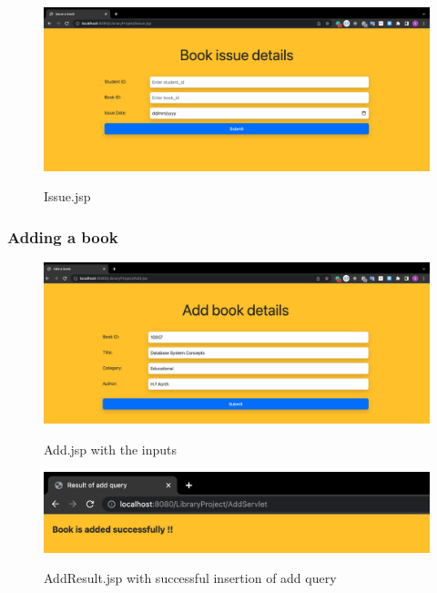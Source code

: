 \documentclass[12pt]{article}
\begin{document}
\newpage

\begin{figure}[!hbt]
    \centering
    \includegraphics[scale=0.34]{screenshots/b3_05.png}
    \label{fig:my_label1}
    \caption{Issue.jsp}
\end{figure}

\newpage

\subsubsection{Adding a book}

\begin{figure}[!hbt]
    \centering
    \includegraphics[scale=0.34]{screenshots/b3_06.png}
    \label{fig:my_label1}
    \caption{Add.jsp with the inputs}
\end{figure}

\begin{figure}[!hbt]
    \centering
    \includegraphics[scale=0.5]{screenshots/b3_07.png}
    \label{fig:my_label1}
    \caption{AddResult.jsp with successful insertion of add query}
\end{figure}
\end{document}
